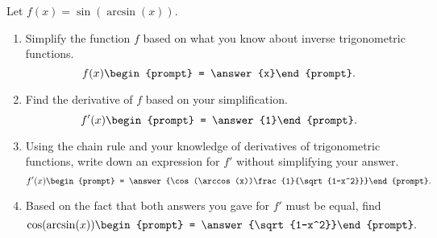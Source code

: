 \documentclass{ximera}
\author{Gregory Hartman \and Matthew Carr}
\begin{document}
\begin{exercise}




Let $f(x)=\sin(\arcsin(x))$.
\begin{enumerate}
\item Simplify the function $f$ based on what you know about inverse trigonometric functions. \[f(x)\begin{prompt} = \answer{x}\end{prompt}.\]
\item Find the derivative of $f$ based on your simplification. \[f'(x)\begin{prompt} = \answer{1}\end{prompt}.\]
\item Using the chain rule and your knowledge of derivatives of trigonometric functions, write down an expression for $f'$ without simplifying your answer. \[f'(x)\begin{prompt} = \answer{\cos(\arccos(x))\frac{1}{\sqrt{1-x^2}}}\end{prompt}.\]
\item Based on the fact that both answers you gave for $f'$ must be equal, find \[\cos(\arcsin(x))\begin{prompt} = \answer{\sqrt{1-x^2}}\end{prompt}.\]
\end{enumerate}

\end{exercise}
\end{document}
